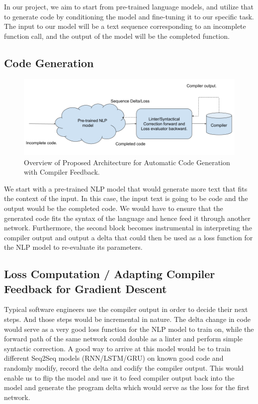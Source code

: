 \documentclass{article}
\begin{document}
In our project, we aim to start from pre-trained language models, and utilize that to generate code by conditioning the model and fine-tuning it to our specific task. The input to our model will be a text sequence corresponding to an incomplete function call, and the output of the model will be the completed function. 

\subsection{Code Generation}

\begin{figure}[!ht]
    \centering
    \includegraphics[scale=0.4]{auto_code_gen_diagram.png}
    \caption{Overview of Proposed Architecture for Automatic Code Generation with Compiler Feedback.}
    \label{fig:auto_code_gen}
\end{figure}

We start with a pre-trained NLP model that would generate more text that fits the context of the input. In this case, the input text is going to be code and the output would be the completed code. We would have to ensure that the generated code fits the syntax of the language and hence feed it through another network. Furthermore, the second block becomes instrumental in interpreting the compiler output and output a delta that could then be used as a loss function for the NLP model to re-evaluate its parameters. 

\subsection{Loss Computation / Adapting Compiler Feedback for Gradient Descent}
Typical software engineers use the compiler output in order to decide their next steps. And those steps would be incremental in nature. The delta change in code would serve as a very good loss function for the NLP model to train on, while the forward path of the same network could double as a linter and perform simple syntactic correction. A good way to arrive at this model would be to train different Seq2Seq models (RNN/LSTM/GRU) on known good code and randomly modify, record the delta and codify the compiler output. This would enable us to flip the model and use it to feed compiler output back into the model and generate the program delta which would serve as the loss for the first network.
\end{document}
